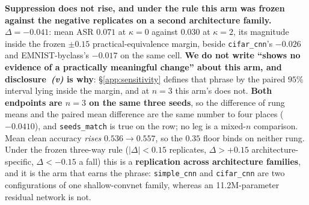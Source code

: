 \documentclass{article}
\begin{document}
\textbf{Suppression does not rise, and under the rule this arm was frozen against the negative replicates on a second architecture family.} $\Delta = -0.041$: mean ASR $0.071$ at $\kappa{=}0$ against $0.030$ at $\kappa{=}2$, its magnitude inside the frozen $\pm0.15$ practical-equivalence margin, beside \texttt{cifar\_cnn}'s $-0.026$ and EMNIST-byclass's $-0.017$ on the same cell. \textbf{We do not write ``shows no evidence of a practically meaningful change'' about this arm, and disclosure~\emph{(v)} is why}: §\ref{app:sensitivity} defines that phrase by the paired $95\%$ interval lying inside the margin, and at $n{=}3$ this arm's does not. \textbf{Both endpoints are $n{=}3$ on the same three seeds}, so the difference of rung means and the paired mean difference are the same number to four places ($-0.0410$), and \texttt{seeds\_match} is true on the row; no leg is a mixed-$n$ comparison. Mean clean accuracy \emph{rises} $0.536 \to 0.557$, so the $0.35$ floor binds on neither rung. Under the frozen three-way rule ($|\Delta| < 0.15$ replicates, $\Delta > +0.15$ architecture-specific, $\Delta < -0.15$ a fall) this is a \textbf{replication across architecture families}, and it is the arm that earns the phrase: \texttt{simple\_cnn} and \texttt{cifar\_cnn} are two configurations of one shallow-convnet family, whereas an 11.2M-parameter residual network is not.
\end{document}
